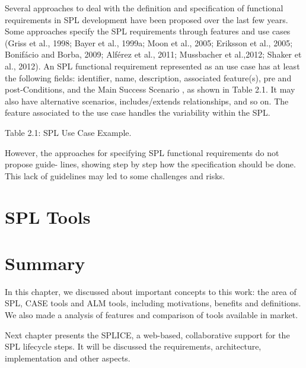 Several approaches to deal with the definition and specification of functional
requirements in SPL development have been proposed over the last few years. Some approaches specify 
the SPL requirements through features and use cases (Griss et al., 1998; Bayer et al., 1999a; Moon et al., 2005; 
Eriksson et al., 2005; Bonifácio and Borba, 2009; Alférez et al., 2011; Mussbacher et al.,2012; Shaker et al., 2012). 
An SPL functional requirement represented as an use case has at least the following fields: identifier, name, 
description, associated feature(s), pre and post-Conditions, and the Main Success Scenario , as shown in 
Table 2.1. It may also have alternative scenarios, includes/extends relationships, and so on. The feature 
associated to the use case handles the variability within the SPL.

Table 2.1: SPL Use Case Example.

However, the approaches for specifying SPL functional requirements do not propose guide- lines, 
showing step by step how the specification should be done. This lack of guidelines may led to some 
challenges and risks.

\section{SPL Tools}
\label{sc:spltools}

\section{Summary}
\label{sc:summary}
In this chapter, we discussed about important concepts to this work: the area of \acf{SPL}, \acf{CASE} tools and \acf{ALM} tools, including motivations, benefits and definitions. We also made a analysis of features and comparison of tools available in market.

Next chapter presents the \acf{SPLICE}, a web-based, collaborative support for the \ac{SPL} lifecycle steps. It will be discussed the requirements, architecture, implementation and other aspects.

